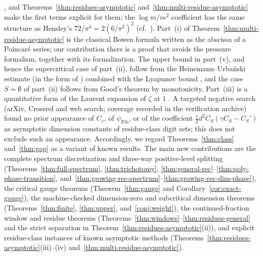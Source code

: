 \cite{DFSU}, and Theorems~\ref{thm:residues-asymptotic}
and~\ref{thm:multi-residue-asymptotic} make the first terms explicit for them;
the $\log m/m^2$ coefficient has the same structure as Hensley's
$72/\pi^4=2(6/\pi^2)^2$ (cf.\ \cite[(1.4)]{DFSU}). Part~(i) of
Theorem~\ref{thm:multi-residue-asymptotic} is the classical Bowen formula
written as the abscissa of a Poincar\'e series; our contribution there is a
proof that avoids the pressure formalism, together with its formalization.
The upper bound in part~(v), and hence the supercritical case of part~(ii),
follow from the Heinemann--Urba\'nski estimate \cite{HU02} (in the form of
\cite[Theorem~2.4]{CLU}) combined with the Lyapunov bound
\cite[Proposition~2.6]{CLU}, and the case $S=\emptyset$ of part~(ii) follows
from Good's theorem by monotonicity. Part~(iii) is a quantitative form of the
Laurent expansion of $\zeta$ at $1$ \cite[(25.2.4)]{DLMF}. A targeted negative
search (arXiv, Crossref and web search; coverage recorded in the verification
archive) found no prior appearance of $C_r$, of $\psi_{\mathrm{Fib}}$, or of the
coefficient $\frac12 d^2C_S(\gamma C_S-C_S')$ as asymptotic dimension constants
of residue-class digit sets; this does not exclude such an appearance.
Accordingly, we
regard Theorems~\ref{thm:class} and~\ref{thm:gap} as a variant of known results.
The main new contributions are the complete spectrum discretization and
three-way positive-level splitting (Theorems~\ref{thm:full-spectrum},
\ref{thm:trichotomy}, \ref{thm:general-rec}--\ref{thm:poly-phase-transition},
and~\ref{thm:growing-rec-spectrum}--\ref{thm:growing-rec-dim-phase}), the critical gauge theorems
(Theorem~\ref{thm:gauge} and Corollary~\ref{cor:exact-gauge}), the machine-checked
dimension-zero and subcritical dimension theorems (Theorems~\ref{thm:finite},
\ref{thm:upper}, and~\ref{conj:weight}), the continued-fraction window and
residue theorems (Theorems~\ref{thm:windows}--\ref{thm:residues-general} and the
strict separation in Theorem~\ref{thm:residues-asymptotic}(ii)), and explicit
residue-class instances of known asymptotic methods
(Theorems~\ref{thm:residues-asymptotic}(iii)--(iv)
and~\ref{thm:multi-residue-asymptotic}).

